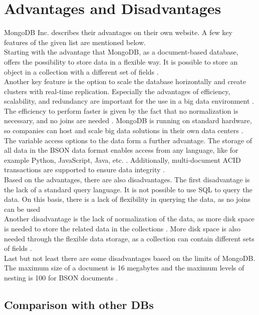 
\section{Advantages and Disadvantages}

MongoDB Inc. describes their advantages on their own website. A few key features of the given list are mentioned below.
\\
Starting with the advantage that MongoDB, as a document-based database, offers the possibility to store data in a flexible way.
It is possible to store an object in a collection with a different set of fields \parencite{Mongo-Advantages}.
\\
Another key feature is the option to scale the database horizontally and create clusters with real-time replication.
Especially the advantages of efficiency, scalability, and redundancy are important for the use in a big data environment \parencite{Mongo-Advantages}.
The efficiency to perform faster is given by the fact that no normalization is necessary, and no joins are needed \parencite[p. 2]{Cottrell2020}.
MongoDB is running on standard hardware, so companies can host and scale big data solutions in their own data centers \parencite[p. 1]{Cottrell2020}.
\\
The variable access options to the data form a further advantage. The storage of all data in the BSON data format enables access from any language, like for example
Python, JavaScript, Java, etc. \parencite{Mongo-Advantages}.
Additionally, multi-document ACID transactions are supported to ensure data integrity \parencite{Mongo-ACID}.
\\
Based on the advantages, there are also disadvantages. The first disadvantage is the lack of a standard query language.
It is not possible to use SQL to query the data. On this basis, there is a lack of flexibility in querying the data, as no joins can be used \parencite{Mongo-Advantages}
\\
Another disadvantage is the lack of normalization of the data, as more disk space is needed to store the related data in the collections \parencite[p. 2]{Cottrell2020}.
More disk space is also needed through the flexible data storage, as a collection can contain different sets of fields \parencite{Mongo-Advantages}.
\\
Last but not least there are some disadvantages based on the limits of MongoDB. The maximum size of a document is 16 megabytes
and the maximum levels of nesting is 100 for BSON documents \parencite{Mongo-Limits}.


\subsection{Comparison with other DBs}

